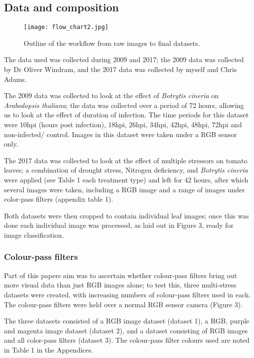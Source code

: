 \documentclass[../../Paper.tex]{subfiles}
\begin{document}
\subsection*{Data and composition}
\begin{wrapfigure}{r}{0.38\textwidth} 
\centering
\texttt{[image: flow\_chart2.jpg]} 
\caption{Outline of the workflow from raw images to final datasets.}
\end{wrapfigure}


The data used was collected during 2009 and 2017; the 2009 data was collected by Dr Oliver Windram, and the 2017 data was collected by myself and Chris Adams. 

The 2009 data was collected to look at the effect of \textit{Botrytis cineria} on \textit{Arabodopsis thaliana}; the data was collected over a period of 72 hours, allowing us to look at the effect of duration of infection. The time periods for this dataset were 10hpi (hours post infection), 18hpi, 26hpi, 34hpi, 42hpi, 48hpi, 72hpi and non-infected/ control. Images in this dataset were taken under a RGB sensor only. 

The 2017 data was collected to look at the effect of multiple stressors on tomato leaves; a combination of drought stress, Nitrogen deficiency, and \textit{Botrytis cineria} were applied (see Table 1 each treatment type) and left for 42 hours, after which several images were taken, including a RGB image and a range of images under color-pass filters (appendix table 1).

Both datasets were then cropped to contain individual leaf images; once this was done each individual image was processed, as laid out in Figure 3, ready for image classification. 


\subsubsection*{Colour-pass filters}

Part of this papers aim was to ascertain whether colour-pass filters bring out more visual data than just RGB images alone; to test this, three multi-stress datasets were created, with increasing numbers of colour-pass filters used in each. The colour-pass filters were held over a normal RGB sensor camera (Figure 3).

The three datasets consisted of a RGB image dataset (dataset 1), a RGB, purple and magenta image dataset (dataset 2), and a dataset consisting of RGB images and all color-pass filters (dataset 3). The colour-pass filter colours used are noted in Table 1 in the Appendices.
\end{document}

